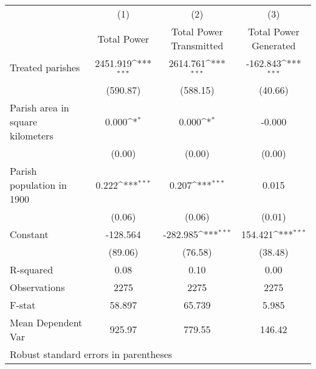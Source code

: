 {
\def\sym#1{\ifmmode^{#1}\else\(^{#1}\)\fi}
\begin{tabular}{l*{3}{c}}
\hline\hline
                    &\multicolumn{1}{c}{(1)}         &\multicolumn{1}{c}{(2)}         &\multicolumn{1}{c}{(3)}         \\
                    & Total Power         &Total Power Transmitted         &Total Power Generated         \\
\hline
Treated parishes    &    2451.919\sym{***}&    2614.761\sym{***}&    -162.843\sym{***}\\
                    &    (590.87)         &    (588.15)         &     (40.66)         \\
Parish area in square kilometers&       0.000\sym{*}  &       0.000\sym{*}  &      -0.000         \\
                    &      (0.00)         &      (0.00)         &      (0.00)         \\
Parish population in 1900&       0.222\sym{***}&       0.207\sym{***}&       0.015         \\
                    &      (0.06)         &      (0.06)         &      (0.01)         \\
Constant            &    -128.564         &    -282.985\sym{***}&     154.421\sym{***}\\
                    &     (89.06)         &     (76.58)         &     (38.48)         \\
\hline
R-squared           &        0.08         &        0.10         &        0.00         \\
Observations        &        2275         &        2275         &        2275         \\
F-stat              &      58.897         &      65.739         &       5.985         \\
Mean Dependent Var  &      925.97         &      779.55         &      146.42         \\
\hline\hline
\multicolumn{4}{l}{\footnotesize Robust standard errors in parentheses}\\
\end{tabular}
}
